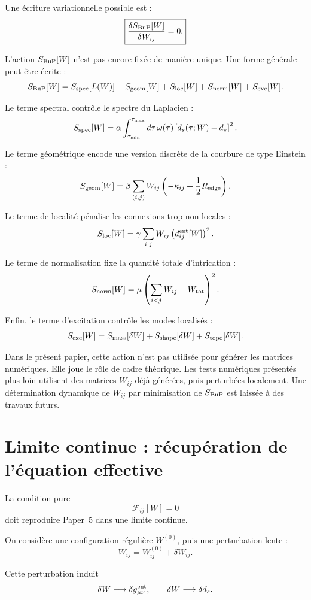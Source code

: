 \documentclass[11pt,a4paper]{article}
\begin{document}
Une écriture variationnelle possible est :
\[
\boxed{
\frac{\delta S_{\rm BuP}[W]}{\delta W_{ij}}=0.
}
\]

L'action \(S_{\rm BuP}[W]\) n'est pas encore fixée de manière unique. Une forme générale peut être écrite :
\[
S_{\rm BuP}[W]
=
S_{\rm spec}[L(W)]
+
S_{\rm geom}[W]
+
S_{\rm loc}[W]
+
S_{\rm norm}[W]
+
S_{\rm exc}[W].
\]

Le terme spectral contrôle le spectre du Laplacien :
\[
S_{\rm spec}[W]
=
\alpha
\int_{\tau_{\min}}^{\tau_{\max}}
d\tau\,\omega(\tau)
\left[
d_s(\tau;W)-d_\star
\right]^2.
\]

Le terme géométrique encode une version discrète de la courbure de type Einstein :
\[
S_{\rm geom}[W]
=
\beta
\sum_{(i,j)}
W_{ij}
\left(
-\kappa_{ij}
+
\frac12R_{\rm edge}
\right).
\]

Le terme de localité pénalise les connexions trop non locales :
\[
S_{\rm loc}[W]
=
\gamma
\sum_{i,j}
W_{ij}
\left(d_{ij}^{\rm ent}[W]\right)^2.
\]

Le terme de normalisation fixe la quantité totale d'intrication :
\[
S_{\rm norm}[W]
=
\mu
\left(
\sum_{i<j}W_{ij}
-
W_{\rm tot}
\right)^2.
\]

Enfin, le terme d'excitation contrôle les modes localisés :
\[
S_{\rm exc}[W]
=
S_{\rm mass}[\delta W]
+
S_{\rm shape}[\delta W]
+
S_{\rm topo}[\delta W].
\]

Dans le présent papier, cette action n'est pas utilisée pour générer les matrices numériques. Elle joue le rôle de cadre théorique. Les tests numériques présentés plus loin utilisent des matrices \(W_{ij}\) déjà générées, puis perturbées localement. Une détermination dynamique de \(W_{ij}\) par minimisation de \(S_{\rm BuP}\) est laissée à des travaux futurs.

\section{Limite continue : récupération de l'équation effective}
\label{sec:continuum}

La condition pure
\[
\mathcal{F}_{ij}[W]=0
\]
doit reproduire Paper~5 dans une limite continue.

On considère une configuration régulière \(W^{(0)}\), puis une perturbation lente :
\[
W_{ij}
=
W_{ij}^{(0)}
+
\delta W_{ij}.
\]

Cette perturbation induit
\[
\delta W
\longrightarrow
\delta g_{\mu\nu}^{\rm ent},
\qquad
\delta W
\longrightarrow
\delta d_s.
\]
\end{document}
